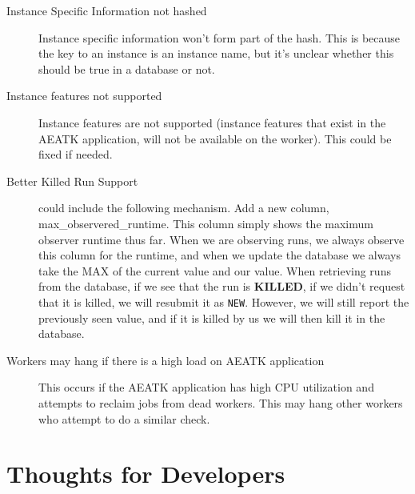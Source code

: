 \documentclass[11pt,letterpaper,oneside]{article}
\begin{document}
\label{sec:known-issues}
\begin{description}

\item[Instance Specific Information not hashed] Instance specific information won't form part of the hash. This is because the key to an instance is an instance name, but it's unclear whether this should be true in a database or not. 

\item[Instance features not supported] Instance features are not supported (instance features that exist in the AEATK application, will not be available on the worker). This could be fixed if needed.


\item[Better Killed Run Support] could include the following mechanism. Add a new column, max\_observered\_runtime. This column simply shows the maximum observer runtime thus far. When we are observing runs, we always observe this column for the runtime, and when we update the database we always take the MAX of the current value and our value. When retrieving runs from the database, if we see that the run is \textbf{KILLED}, if we didn't request that it is killed, we will resubmit it as \texttt{NEW}. However, we will still report the previously seen value, and if it is killed by us we will then kill it in the database.

\item[Workers may hang if there is a high load on AEATK application] This occurs if the AEATK application has high CPU utilization and attempts to reclaim jobs from dead workers. This may hang other workers who attempt to do a similar check.


\end{description}



\section{Thoughts for Developers}
\end{document}
